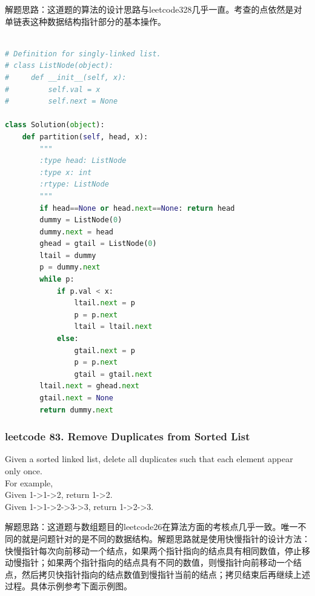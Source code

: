 \documentclass[a4paper,10pt]{article}
\begin{document}
\begin{CJK*}{UTF8}{gbsn}
\noindent 解题思路：这道题的算法的设计思路与leetcode328几乎一直。考查的点依然是对单链表这种数据结构指针部分的基本操作。
\end{CJK*}

\begin{lstlisting}[language=Python, caption=Problem86. Partition List]

# Definition for singly-linked list.
# class ListNode(object):
#     def __init__(self, x):
#         self.val = x
#         self.next = None

class Solution(object):
    def partition(self, head, x):
        """
        :type head: ListNode
        :type x: int
        :rtype: ListNode
        """
        if head==None or head.next==None: return head
        dummy = ListNode(0)
        dummy.next = head
        ghead = gtail = ListNode(0)
        ltail = dummy
        p = dummy.next
        while p:
            if p.val < x:
                ltail.next = p
                p = p.next
                ltail = ltail.next
            else:
                gtail.next = p
                p = p.next
                gtail = gtail.next
        ltail.next = ghead.next
        gtail.next = None
        return dummy.next
\end{lstlisting}



\subsubsection{leetcode 83. Remove Duplicates from Sorted List}
Given a sorted linked list, delete all duplicates such that each element appear only once. \\

\noindent For example,\\
\indent Given 1->1->2, return 1->2. \\
\indent Given 1->1->2->3->3, return 1->2->3. \\

\begin{CJK*}{UTF8}{gbsn}
\noindent 解题思路：这道题与数组题目的leetcode26在算法方面的考核点几乎一致。唯一不同的就是问题针对的是不同的数据结构。解题思路就是使用快慢指针的设计方法：快慢指针每次向前移动一个结点，如果两个指针指向的结点具有相同数值，停止移动慢指针；如果两个指针指向的结点具有不同的数值，则慢指针向前移动一个结点，然后拷贝快指针指向的结点数值到慢指针当前的结点；拷贝结束后再继续上述过程。具体示例参考下面示例图。
\end{CJK*}
\end{document}

